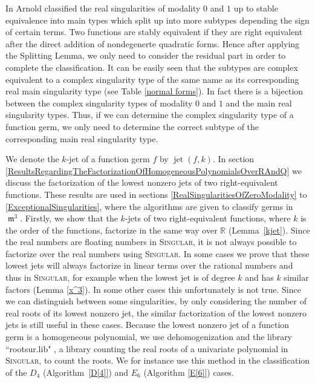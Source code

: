\documentclass[noend]{amsproc}
\DeclareMathOperator{\m}{\mathfrak{m}}
\DeclareMathOperator{\jet}{jet}
\begin{document}
In \cite{AVG1985} Arnold classified the real singularities of modality $0$ and
$1$ up to stable equivalence into main types which split up into more subtypes
depending the sign of certain terms. Two functions are stably equivalent if
they are right equivalent after the direct addition of nondegenerte quadratic
forms. Hence after applying the Splitting Lemma,  we only need to consider the
residual part in order to complete the classification.   It can be easily seen
that the subtypes are complex equivalent to a complex singularity type of the
same name as its corresponding real main singularity type (see Table
\ref{normal forms}). In fact there is a bijection between the complex
singularity types of modality $0$ and $1$ and the main real singularity types.
Thus, if we can determine the complex singularity type of a function germ, we
only need to determine the correct subtype of the corresponding main real
singularity type.

We denote the $k$-jet of a function germ $f$ by $\jet(f,k)$. In section
\ref{ResultsRegardingTheFactorizationOfHomogeneousPolynomialsOverRAndQ} we
discuss the factorization of the lowest nonzero jets of two right-equivalent
functions. These results are used in sections
\ref{RealSingularitiesOfZeroModality} to \ref{ExceptionalSingularities}, where
the algorithms are given to classify germs in $\m^3$. Firstly, we show that the
$k$-jets of two right-equivalent functions, where $k$ is the order of the
functions, factorize in the same way over $\mathbb R$ (Lemma~\ref{kjet}). Since
the real numbers are floating numbers in \textsc{Singular}, it is not always
possible to factorize over the real numbers using \textsc{Singular}. In some
cases we prove that these lowest jets will always factorize in linear terms
over the rational numbers and thus in \textsc{Singular}, for example when the
lowest jet is of degree $k$ and has $k$ similar factors (Lemma \ref{x^3}). In
some other cases this unfortunately is not true. Since we can distinguish
between some singularities, by only considering the number of real roots of its
lowest nonzero jet, the similar factorization of the lowest nonzero jets is
still useful in these cases. Because the lowest nonzero jet of a function germ
is a homogeneous polynomial, we use dehomogenization and the library
``rootsur.lib" \cite{roots}, a library counting the real roots of a univariate
polynomial in \textsc{Singular}, to count the roots. We for instance use this
method in the classification of the $D_4$ (Algorithm~\ref{D[4]}) and $E_6$
(Algorithm \ref{E[6]}) cases.
\end{document}
